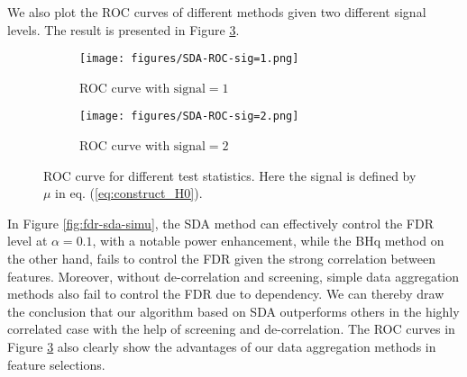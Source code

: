 \documentclass[12pt]{article}
\theoremstyle{plain}
\begin{document}
\begin{sloppypar}
\begin{figure}
\end{figure}
We also plot the ROC curves of different methods given two different signal levels. The result is presented in Figure \ref{fig:sda-roc}.
  \begin{figure}[H]
  \centering
\begin{subfigure}{0.45\textwidth}
         \texttt{[image: figures/SDA-ROC-sig=1.png]}
     \caption{ROC curve with $\text{signal} = 1$}
     \label{fig:sda-roc-1}
\end{subfigure}
\begin{subfigure}{0.45\textwidth}
         \texttt{[image: figures/SDA-ROC-sig=2.png]}
     \caption{ROC curve with $\text{signal} = 2$}
     \label{fig:sda-roc-2}
\end{subfigure}
\caption{ROC curve for different test statistics. Here the signal is defined by $\mu$ in eq. (\ref{eq:construct_H0}).}
     \label{fig:sda-roc}
     \end{figure}

In Figure \ref{fig:fdr-sda-simu}, the SDA method can effectively control the FDR level at $\alpha=0.1$, with a notable power enhancement, while the BHq method on the other hand, fails to control the FDR given the strong correlation between features. Moreover, without de-correlation and screening, simple data aggregation methods also fail to control the FDR due to dependency.
We can thereby draw the conclusion that our algorithm based on SDA outperforms others in the highly correlated case with the help of screening and de-correlation. The ROC curves in Figure \ref{fig:sda-roc} also clearly show the advantages of our data aggregation methods in feature selections.


\end{sloppypar}
\end{document}

